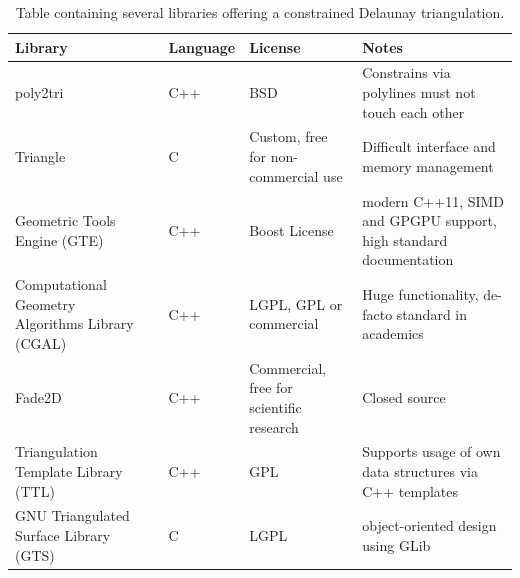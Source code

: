 \renewcommand{\arraystretch}{1.5} %
\begin{table}[h]
	\centering
	\begin{tabular}{p{3cm} l l p{2.1cm} p{3.9cm}}
		Library                                          &                           & Language & License                                  & Notes                                                             \\
		\midrule
		poly2tri                                         & \cite{poly2tri}           & C++      & BSD                                      & Constrains via polylines must not touch each other                \\
		Triangle                                         & \cite{triangle_lib}       & C        & Custom, free for non-commercial use      & Difficult interface and memory management                         \\
		Geometric Tools Engine (GTE)                     & \cite{gte}                & C++      & Boost License                            & modern C++11, SIMD and GPGPU support, high standard documentation \\
		Computational Geometry Algorithms Library (CGAL) & \cite{cgal_triangulation} & C++      & LGPL, GPL or commercial                  & Huge functionality, de-facto standard in academics                \\
		Fade2D                                           & \cite{fade2d}             & C++      & Commercial, free for scientific research & Closed source                                                     \\
		Triangulation Template Library (TTL)             & \cite{ttl}                & C++      & GPL                                      & Supports usage of own data structures via C++ templates           \\
		GNU Triangulated Surface Library (GTS)           & \cite{gts}                & C        & LGPL                                     & object-oriented design using GLib                                 \\
	\end{tabular}
	\caption{
		Table containing several libraries offering a constrained Delaunay triangulation.
	}
	\label{tbl:delaunay_libs}
\end{table}
\renewcommand{\arraystretch}{1.0}


